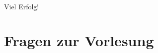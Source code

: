 \documentclass[11pt,a4paper,addpoints]{exam}
\begin{document}
	
	\vspace{1cm}
	
	\begin{center}
	\Large Viel Erfolg!
	\end{center}
	
	\vspace{1.5cm}


\vspace{1.5cm}


\vspace{1.5cm}

\newpage
\section*{Fragen zur Vorlesung}
\end{document}
